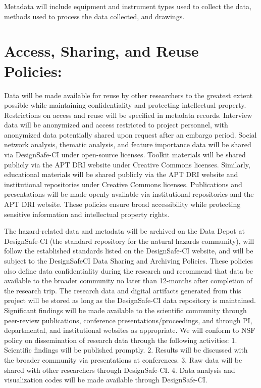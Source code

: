 \documentclass[11pt]{article}
\begin{document}
Metadata will include equipment and instrument types used to collect the data, methods used to process the data collected, and drawings. 

\vspace{0.3cm}
\section{Access, Sharing, and Reuse Policies:} Data will be made available for reuse by other researchers to the greatest extent possible while maintaining confidentiality and protecting intellectual property. Restrictions on access and reuse will be specified in metadata records. Interview data will be anonymized and access restricted to project personnel, with anonymized data potentially shared upon request after an embargo period. Social network analysis, thematic analysis, and feature importance data will be shared via DesignSafe-CI under open-source licenses. Toolkit materials will be shared publicly via the APT DRI website under Creative Commons licenses. Similarly, educational materials will be shared publicly via the APT DRI website and institutional repositories under Creative Commons licenses. Publications and presentations will be made openly available via institutional repositories and the APT DRI website. These policies ensure broad accessibility while protecting sensitive information and intellectual property rights.

The hazard-related data and metadata will be archived on the Data Depot at DesignSafe-CI (the standard repository for the natural hazards community), will follow the established standards listed on the DesignSafe-CI website, and will be subject to the DesignSafeCI Data Sharing and Archiving Policies. 
These policies also define data confidentiality during the research and recommend that data be available to the broader community no later than 12-months after completion of the research trip. 
The research data and digital artifacts generated from this project will be stored as long as the DesignSafe-CI data repository is maintained. 
Significant findings will be made available to the scientific community through peer-review publications, conference presentations/proceedings, and through PI, departmental, and institutional websites as appropriate.  
We will conform to NSF policy on dissemination of research data through the following activities: 1. Scientific findings will be published promptly. 2. Results will be discussed with the broader community via presentations at conferences. 3. Raw data will be shared with other researchers through DesignSafe-CI. 4. Data analysis and visualization codes will be made available through DesignSafe-CI. 
\end{document}
